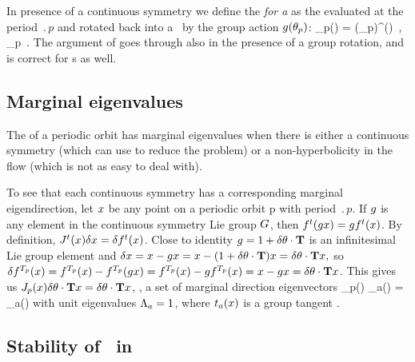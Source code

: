 {In presence of a continuous symmetry we define the
\emph{{\FloquetM} for a \rpo} as the {\jacobianM} evaluated
at the period $\period{p}$ and rotated back into a \po\ by the
group action $g({\bf \theta}_p)$:
\beq
 \jMps_p(\ssp) = \LieEl(\gSpace_p)\jMps^(\ssp)
    \,,\qquad
\ssp  \in \pS_p
\,.
The argument of  goes through also in
the presence of a group rotation,
and  is correct for \rpo s as well.

\subsection{Marginal eigenvalues}

The {\jacobianM} of a periodic orbit has marginal eigenvalues
when there is either a continuous symmetry (which can use to
reduce the problem) or a non-hyperbolicity in the flow (which
is not as easy to deal with).

To see that each continuous symmetry has a corresponding
marginal eigendirection, let $x$ be any point on a periodic
orbit p with period $\period{p}$. If $g$ is any element in
the continuous symmetry Lie group $G$, then $f^t(g x)
= g f^t(x)$. By definition, $J^t(x)
\delta x = \delta f^t(x)$.
Close to identity $g = 1+\delta
\theta \cdot \mathbf{T}$ is an infinitesimal Lie group element and
$\delta x = x - g x = x - (1+\delta \theta
\cdot \mathbf{T}) x  = \delta \theta \cdot \mathbf{T} x,$
so
$\delta f^{{T_{p}}}(x) = f^{{T_{p}}}(x) -
f^{{T_{p}}}(g x)= f^{{T_{p}}}(x) - g f^{{T_{p}}}(x) =
x - g x = \delta \theta \cdot \mathbf{T} x$.
This gives us
$J_p(x) \delta \theta \cdot \mathbf{T} x = \delta
\theta \cdot \mathbf{T} x$,
\ie, a set of marginal direction eigenvectors
\beq
 \jMps_p(\ssp) \groupTan_{a}(\ssp) =
\groupTan_{a}(\ssp)
with unit eigenvalues $\Lambda_a=1$,
where $t_{a}(x)$ is a group tangent .


\subsection{Stability of \reqva\ in \reducedsp}

}
